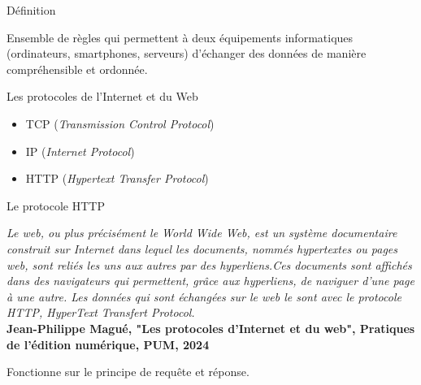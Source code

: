 \begin{frame}{Définition}
\begin{block}{}
    Ensemble de règles qui permettent à deux équipements informatiques (ordinateurs, smartphones, serveurs) d'échanger des données de manière compréhensible et ordonnée.
\end{block}

\begin{block}{Les protocoles de l'Internet et du Web}
    \begin{itemize}
        \item TCP (\textit{Transmission Control Protocol})
        \item IP (\textit{Internet Protocol})
        \item HTTP (\textit{Hypertext Transfer Protocol})
    \end{itemize}
\end{block}
    
\end{frame}

\begin{frame}{Le protocole HTTP}
    \begin{block}{}
        \centering
        {\small \textit{Le web, ou plus précisément le World Wide Web, est un système documentaire construit sur Internet dans lequel les documents, nommés hypertextes ou pages web, sont reliés les uns aux autres par des hyperliens.Ces documents sont affichés dans des navigateurs qui permettent, grâce aux hyperliens, de naviguer d’une page à une autre. Les données qui sont échangées sur le web le sont avec le protocole HTTP, HyperText Transfert Protocol.}}\\
        \textbf{Jean-Philippe Magué, "Les protocoles d’Internet et du web", Pratiques de l'édition numérique, PUM, 2024}
    \end{block}

    \begin{block}{}
        \textrightarrow{} Fonctionne sur le principe de requête et réponse.
    \end{block}
\end{frame}

